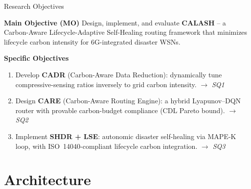 \documentclass[aspectratio=169, 11pt]{beamer}
\begin{document}
\begin{frame}{Research Objectives}
\begin{block}{\textbf{Main Objective (MO)}}
Design, implement, and evaluate \textbf{CALASH} -- a Carbon-Aware Lifecycle-Adaptive Self-Healing routing framework that minimizes lifecycle carbon intensity for 6G-integrated disaster WSNs.
\end{block}

\vspace{2mm}
\begin{exampleblock}{\textbf{Specific Objectives}}
\begin{enumerate}[nosep]
    \item[\textbf{SO1}] Develop \textbf{CADR} (Carbon-Aware Data Reduction): dynamically tune compressive-sensing ratios inversely to grid carbon intensity.
    \hfill \textit{$\rightarrow$ SQ1}

    \vspace{1mm}
    \item[\textbf{SO2}] Design \textbf{CARE} (Carbon-Aware Routing Engine): a hybrid Lyapunov--DQN router with provable carbon-budget compliance (CDL Pareto bound).
    \hfill \textit{$\rightarrow$ SQ2}

    \vspace{1mm}
    \item[\textbf{SO3}] Implement \textbf{SHDR + LSE}: autonomic disaster self-healing via MAPE-K loop, with ISO~14040-compliant lifecycle carbon integration.
    \hfill \textit{$\rightarrow$ SQ3}
\end{enumerate}
\end{exampleblock}
\end{frame}

\section{Architecture}
\end{document}
